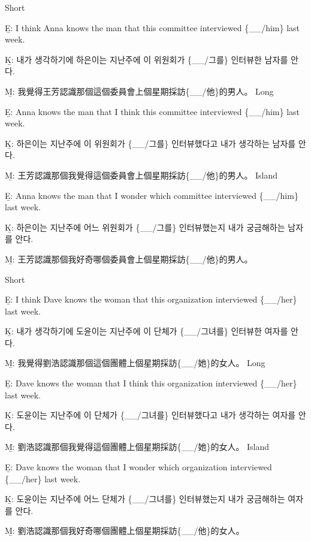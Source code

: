 \pex %
\a Short\par\nobreak
\beginsubsub
\b{E:} I think Anna knows the man that this committee interviewed \{\_\_/him\} last week.\par\nobreak
\b{K:} \ko 내가 생각하기에 하은이는 지난주에 이 위원회가 \{\_\_/그를\} 인터뷰한 남자를 안다. \normalfont\par\nobreak
\b{M:} \zh 我覺得王芳認識那個這個委員會上個星期採訪\{\_\_/他\}的男人。 \normalfont
\endsubsub
\a Long\par\nobreak
\beginsubsub
\b{E:} Anna knows the man that I think this committee interviewed \{\_\_/him\} last week.\par\nobreak
\b{K:} \ko 하은이는 지난주에 이 위원회가 \{\_\_/그를\} 인터뷰했다고 내가 생각하는 남자를 안다. \normalfont\par\nobreak
\b{M:} \zh 王芳認識那個我覺得這個委員會上個星期採訪\{\_\_/他\}的男人。 \normalfont
\endsubsub
\a Island\par\nobreak
\beginsubsub
\b{E:} Anna knows the man that I wonder which committee interviewed \{\_\_/him\} last week.\par\nobreak
\b{K:} \ko 하은이는 지난주에 어느 위원회가 \{\_\_/그를\} 인터뷰했는지 내가 궁금해하는 남자를 안다\normalfont.\par\nobreak
\b{M:} \zh 王芳認識那個我好奇哪個委員會上個星期採訪\{\_\_/他\}的男人。\normalfont
\endsubsub
\xe

\pex %
\a Short\par\nobreak
\beginsubsub
\b{E:} I think Dave knows the woman that this organization interviewed \{\_\_/her\} last week.\par\nobreak
\b{K:} \ko 내가 생각하기에 도윤이는 지난주에 이 단체가 \{\_\_/그녀를\} 인터뷰한 여자를 안다. \normalfont\par\nobreak
\b{M:} \zh 我覺得劉浩認識那個這個團體上個星期採訪\{\_\_/她\}的女人。 \normalfont
\endsubsub
\a Long\par\nobreak
\beginsubsub
\b{E:} Dave knows the woman that I think this organization interviewed \{\_\_/her\} last week.\par\nobreak
\b{K:} \ko 도윤이는 지난주에 이 단체가 \{\_\_/그녀를\} 인터뷰했다고 내가 생각하는 여자를 안다. \normalfont\par\nobreak
\b{M:} \zh 劉浩認識那個我覺得這個團體上個星期採訪\{\_\_/她\}的女人。 \normalfont
\endsubsub
\a Island\par\nobreak
\beginsubsub
\b{E:} Dave knows the woman that I wonder which organization interviewed \{\_\_/her\} last week.\par\nobreak
\b{K:} \ko 도윤이는 지난주에 어느 단체가 \{\_\_/그녀를\} 인터뷰했는지 내가 궁금해하는 여자를 안다\normalfont.\par\nobreak
\b{M:} \zh 劉浩認識那個我好奇哪個團體上個星期採訪\{\_\_/他\}的女人。\normalfont
\endsubsub
\xe

